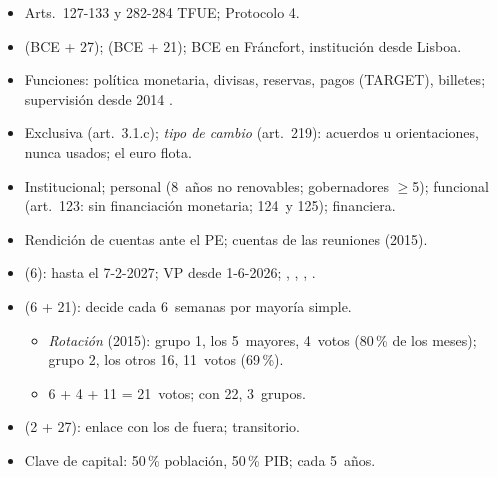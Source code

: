 \documentclass{article}
\begin{document}
\begin{columnas}
\begin{itemize}
\item Arts.~127-133 y 282-284 TFUE; Protocolo 4.
\item {} (BCE + 27);  (BCE + 21); BCE en Fráncfort, institución desde Lisboa.
\item Funciones: política monetaria, divisas, reservas, pagos (TARGET), billetes; supervisión desde 2014 .
\item Exclusiva (art.~3.1.c); \emph{tipo de cambio} (art.~219): acuerdos u orientaciones, nunca usados; el euro flota.
\end{itemize}
\begin{itemize}
\item Institucional; personal (8~años no renovables; gobernadores $\geq$5); funcional (art.~123: sin financiación monetaria; 124~y 125); financiera.
\item Rendición de cuentas ante el PE; cuentas de las reuniones (2015).
\end{itemize}
\begin{itemize}
\item {} (6):  hasta el 7-2-2027;  VP desde 1-6-2026; , , , .
\item {} (6 + 21): decide cada 6~semanas por mayoría simple.
  \begin{itemize}
  \item \emph{Rotación} (2015): grupo 1, los 5~mayores, 4~votos (80\,\% de los meses); grupo 2, los otros 16, 11~votos (69\,\%).
  \item 6 + 4 + 11 = 21~votos; con 22, 3~grupos.
  \end{itemize}
\item {} (2 + 27): enlace con los de fuera; transitorio.
\item Clave de capital: 50\,\% población, 50\,\% PIB; cada 5~años.
\end{itemize}


\end{columnas}
\end{document}

